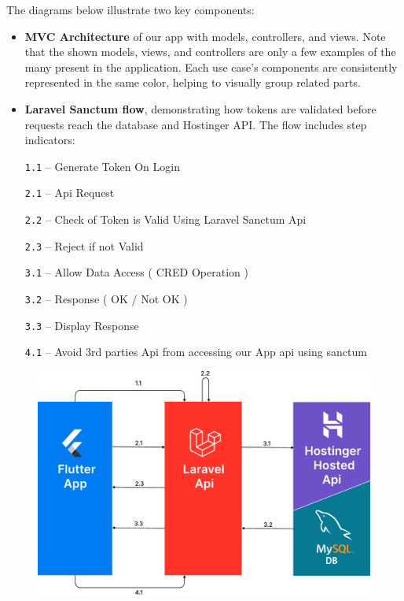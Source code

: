 \documentclass[12pt]{report}
\begin{document}
The diagrams below illustrate two key components:
\begin{itemize}
	\item \textbf{MVC Architecture} of our app with models, controllers, and views. Note that the shown models, views, and controllers are only a few examples of the many present in the application. Each use case’s components are consistently represented in the same color, helping to visually group related parts.
	\item \textbf{Laravel Sanctum flow}, demonstrating how tokens are validated before requests reach the database and Hostinger API. The flow includes step indicators:

	      \par \texttt{1.1} – Generate Token On Login
	      \par \texttt{2.1} – Api Request
	      \par \texttt{2.2} – Check of Token is Valid Using Laravel Sanctum Api
	      \par \texttt{2.3} – Reject if not Valid
	      \par \texttt{3.1} – Allow Data Access ( CRED Operation )
	      \par \texttt{3.2} – Response ( OK / Not OK )
	      \par \texttt{3.3} – Display Response
	      \par \texttt{4.1} – Avoid 3rd parties Api from accessing our App api using sanctum

\end{itemize}
\vspace*{0.4cm}
\begin{figure}[H]
	\centering
	\includegraphics[width=1\textwidth]{images/sanctum@2x.pdf}
\end{figure}
\end{document}
